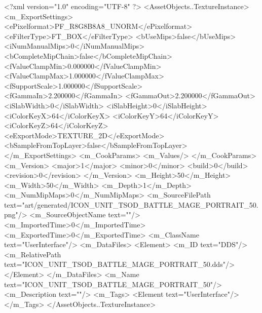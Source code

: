 <?xml version="1.0" encoding="UTF-8" ?>
<AssetObjects..TextureInstance>
	<m_ExportSettings>
		<ePixelformat>PF_R8G8B8A8_UNORM</ePixelformat>
		<eFilterType>FT_BOX</eFilterType>
		<bUseMips>false</bUseMips>
		<iNumManualMips>0</iNumManualMips>
		<bCompleteMipChain>false</bCompleteMipChain>
		<fValueClampMin>0.000000</fValueClampMin>
		<fValueClampMax>1.000000</fValueClampMax>
		<fSupportScale>1.000000</fSupportScale>
		<fGammaIn>2.200000</fGammaIn>
		<fGammaOut>2.200000</fGammaOut>
		<iSlabWidth>0</iSlabWidth>
		<iSlabHeight>0</iSlabHeight>
		<iColorKeyX>64</iColorKeyX>
		<iColorKeyY>64</iColorKeyY>
		<iColorKeyZ>64</iColorKeyZ>
		<eExportMode>TEXTURE_2D</eExportMode>
		<bSampleFromTopLayer>false</bSampleFromTopLayer>
	</m_ExportSettings>
	<m_CookParams>
		<m_Values/>
	</m_CookParams>
	<m_Version>
		<major>1</major>
		<minor>0</minor>
		<build>0</build>
		<revision>0</revision>
	</m_Version>
	<m_Height>50</m_Height>
	<m_Width>50</m_Width>
	<m_Depth>1</m_Depth>
	<m_NumMipMaps>0</m_NumMipMaps>
	<m_SourceFilePath text="art/generated/ICON_UNIT_TSOD_BATTLE_MAGE_PORTRAIT_50.png"/>
	<m_SourceObjectName text=""/>
	<m_ImportedTime>0</m_ImportedTime>
	<m_ExportedTime>0</m_ExportedTime>
	<m_ClassName text="UserInterface"/>
	<m_DataFiles>
		<Element>
			<m_ID text="DDS"/>
			<m_RelativePath text="ICON_UNIT_TSOD_BATTLE_MAGE_PORTRAIT_50.dds"/>
		</Element>
	</m_DataFiles>
	<m_Name text="ICON_UNIT_TSOD_BATTLE_MAGE_PORTRAIT_50"/>
	<m_Description text=""/>
	<m_Tags>
		<Element text="UserInterface"/>
	</m_Tags>
</AssetObjects..TextureInstance>
